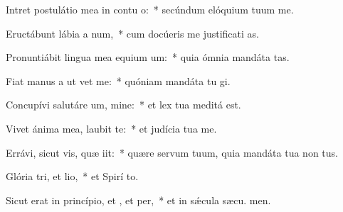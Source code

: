 \item Intret postulátio mea in contu o:~* secúndum elóquium tuum  me.
\item Eructábunt lábia a num,~* cum docúeris me justificati as.
\item Pronuntiábit lingua mea equium um:~* quia ómnia mandáta  tas.
\item Fiat manus a ut vet me:~* quóniam mandáta tu gi.
\item Concupívi salutáre um, mine:~* et lex tua meditá  est.
\item Vivet ánima mea,  laubit te:~* et judícia tua  me.
\item Errávi, sicut vis, quæ iit:~* quære servum tuum, quia mandáta tua non  tus.
\item Glória tri, et lio,~* et Spirí to.
\item Sicut erat in princípio, et , et per,~* et in sǽcula sæcu. men.
